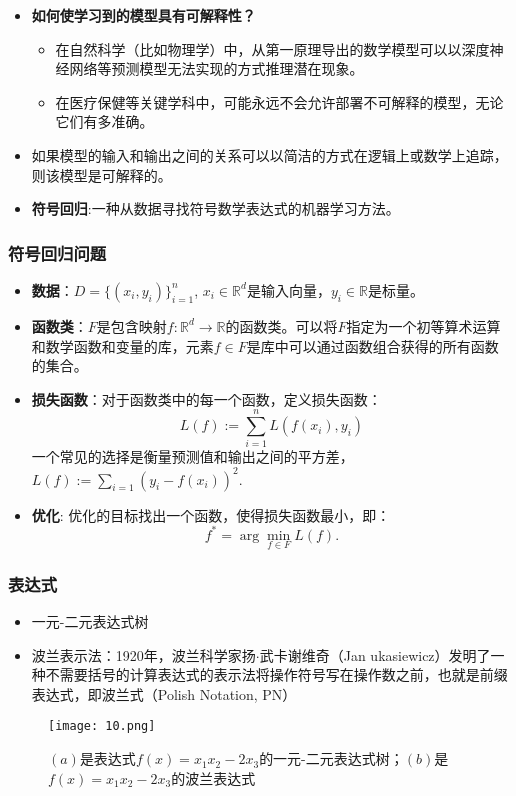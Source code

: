\documentclass[CJK,aspectratio=169]{beamer}  %
\begin{document}
	\begin{frame}
		\begin{itemize}
			\item \textbf{\Large{如何使学习到的模型具有可解释性？}}
			\begin{itemize}
				\item 在自然科学（比如物理学）中，从第一原理导出的数学模型可以以深度神经网络等预测模型无法实现的方式推理潜在现象。
				\item 在医疗保健等关键学科中，可能永远不会允许部署不可解释的模型，无论它们有多准确。
				
				
			\end{itemize}
			\item \large{如果模型的输入和输出之间的关系可以以简洁的方式在逻辑上或数学上追踪，则该模型是可解释的。}
			\item \textbf{符号回归}:一种从数据寻找符号数学表达式的机器学习方法。
		\end{itemize}
	\end{frame}
	\begin{frame}
		\frametitle{符号回归问题}
		\begin{itemize}
			\item \textbf{数据}：$D=\{(x_i,y_i)\}_{i=1}^{n}$, $x_i\in \mathbb{R}^d$是输入向量，$y_i\in \mathbb{R}$是标量。
			\item \textbf{函数类}：$F$是包含映射$f:\mathbb{R}^d\rightarrow \mathbb{R}$的函数类。可以将$F$指定为一个初等算术运算和数学函数和变量的库，元素$f\in F$是库中可以通过函数组合获得的所有函数的集合。
			\item \textbf{损失函数}：对于函数类中的每一个函数，定义损失函数：
			$$L(f):=\sum_{i=1}^{n}L(f(x_i),y_i)$$
			一个常见的选择是衡量预测值和输出之间的平方差，$L(f):=\sum_{i=1}(y_i-f(x_i))^2.$
			\item \textbf{优化}: 优化的目标找出一个函数，使得损失函数最小，即：
			$$f^*=\arg\min_{f\in F} L(f).$$
		\end{itemize}
	\end{frame}
	\begin{frame}
		\frametitle{表达式}
		\begin{itemize}
			\item 一元-二元表达式树
			\item 波兰表示法：1920年，波兰科学家扬$\cdot$武卡谢维奇（Jan ukasiewicz）发明了一种不需要括号的计算表达式的表示法将操作符号写在操作数之前，也就是前缀表达式，即波兰式（Polish Notation, PN）
			
		\end{itemize}
		\begin{figure}
			\centering
			\texttt{[image: 10.png]}
			\captionsetup{font=tiny}
			\caption{$(a)$是表达式$f(x)=x_1x_2-2x_3$的一元-二元表达式树；$(b)$是$f(x)=x_1x_2-2x_3$的波兰表达式}
		\end{figure}
	\end{frame}
\end{document}
